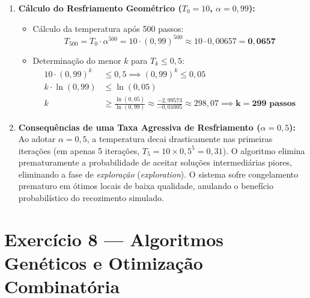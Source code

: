 \begin{enumerate}[label=(\alph*)]
    \item \textbf{Cálculo do Resfriamento Geométrico ($T_0 = 10$, $\alpha = 0{,}99$):}
    \begin{itemize}
        \item Cálculo da temperatura após 500 passos:
        \begin{equation*}
            T_{500} = T_0 \cdot \alpha^{500} = 10 \cdot (0{,}99)^{500} \approx 10 \cdot 0{,}00657 = \mathbf{0{,}0657}
        \end{equation*}
        \item Determinação do menor $k$ para $T_k \le 0{,}5$:
        \begin{align*}
            10 \cdot (0{,}99)^k &\le 0{,}5 \implies (0{,}99)^k \le 0{,}05 \\
            k \cdot \ln(0{,}99) &\le \ln(0{,}05) \\
            k &\ge \frac{\ln(0{,}05)}{\ln(0{,}99)} \approx \frac{-2{,}99573}{-0{,}01005} \approx 298{,}07 \implies \mathbf{k = 299 \text{ passos}}
        \end{align*}
    \end{itemize}

    \item \textbf{Consequências de uma Taxa Agressiva de Resfriamento ($\alpha = 0{,}5$):}
    Ao adotar $\alpha = 0{,}5$, a temperatura decai drasticamente nas primeiras iterações (em apenas 5 iterações, $T_5 = 10 \times 0{,}5^5 = 0{,}31$). O algoritmo elimina prematuramente a probabilidade de aceitar soluções intermediárias piores, eliminando a fase de \textit{exploração} (\textit{exploration}). O sistema sofre congelamento prematuro em ótimos locais de baixa qualidade, anulando o benefício probabilístico do recozimento simulado.
\end{enumerate}

\section{Exercício 8 — Algoritmos Genéticos e Otimização Combinatória}

